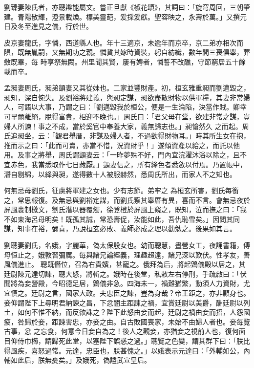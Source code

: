 \begin{pinyinscope}
 劉臻妻陳氏者，亦聰辯能屬文。嘗正旦獻《椒花頌》，其詞曰：「旋穹周回，三朝肇建。青陽散輝，澄景載煥。標美靈葩，爰採爰獻。聖容映之，永壽於萬。」又撰元日及冬至進見之儀，行於世。



 皮京妻龍氏，字憐，西道縣人也。年十三適京，未逾年而京卒，京二弟亦相次而隕，既無胤嗣，又無期功之親。憐貨其嫁時資裝，躬自紡織，數年間三喪俱舉，葬斂既畢，每
 時享祭無闕。州里聞其賢，屢有娉者，憐誓不改醮，守節窮居五十餘載而卒。



 孟昶妻周氏，昶弟顗妻又其從妹也。二家並豐財產。初，桓玄雅重昶而劉邁毀之，昶知，深自惋失。及劉裕將建義，與昶定謀，昶欲盡散財物以供軍糧，其妻非常婦人，可語以大事，乃謂之曰：「劉邁毀我於桓公，便是一生淪陷，決當作賊。卿幸可早爾離絕，脫得富貴，相迎不晚也。」周氏曰：「君父母在堂，欲建非常之謀，豈婦人所諫！事之不成，當於奚官中奉養大家，義無歸志也。」昶愴然久
 之而起。周氏追昶坐，云：「觀君舉厝，非謀及婦人者，不過欲得財物耳。」時其所生女在抱，推而示之曰：「此而可賣，亦當不惜，況資財乎！」遂傾資產以給之，而託以他用。及事之將舉，周氏謂顗妻云：「一昨夢殊不好，門內宜浣濯沐浴以除之，且不宜赤色，我當悉取作七日藏厭。」顗妻信之，所有絳色者悉斂以付焉。乃置帳中，潛自剔綿，以絳與昶，遂得數十人被服赫然，悉周氏所出，而家人不之知也。



 何無忌母劉氏，征虜將軍建之女也。少有志節。弟牢之
 為桓玄所害，劉氏每銜之，常思報復。及無忌與劉裕定謀，而劉氏察其舉厝有異，喜而不言。會無忌夜於屏風裹制檄文，劉氏潛以器覆燭，徐登橙於屏風上窺之，既知，泣而撫之曰：「我不如東海呂母明矣！既孤其誠，常恐壽促，汝能如此，吾仇恥雪矣。」因問其同謀，知事在裕，彌喜，乃說桓玄必敗、義師必成之理以勸勉之。後果如其言。



 劉聰妻劉氏，名娥，字麗華，偽太保殷女也。幼而聰慧，晝營女工，夜誦書籍，傅母恒止之，娥敦習彌厲。每與諸兄論經義，理趣超遠，諸兄深以歎伏。性孝友，善風儀進止。
 聰既僭位，召為右貴嬪，甚寵之。俄拜為后，將起䳨儀殿以居之，其廷尉陳元達切諫，聰大怒，將斬之。娥時在後堂，私敕左右停刑，手疏啟曰：「伏聞將為妾營殿，今昭德足居，䳨儀非急。四海未一，禍難猶繁，動須人力資財，尤宜慎之。廷尉之言，國家大政。夫忠臣之諫，豈為身哉？帝王距之，亦非顧身也。妾仰謂陛下上尋明君納諫之昌，下忿闇主距諫之禍，宜賞廷尉以美爵，酬廷尉以列土，如何不惟不納，而反欲誅之？陛下此怒由妾而起，廷尉之禍由妾而招，人怨國疲，咎歸於妾，距諫害忠，亦妾之由。自古敗國喪家，未始不由婦人者也。妾每覽古事，忿
 之忘食，何意今日妾自為之！後人之觀妾，亦猶妾之視前人也，復何面目仰侍巾櫛，請歸死此堂，以塞陛下誤惑之過。」聰覽之色變，謂其群下曰：「朕比得風疾，喜怒過常。元達，忠臣也，朕甚愧之。」以娥表示元達曰：「外輔如公，內輔如此后，朕無憂矣。」及娥死，偽謚武宣皇后。




\end{pinyinscope}
